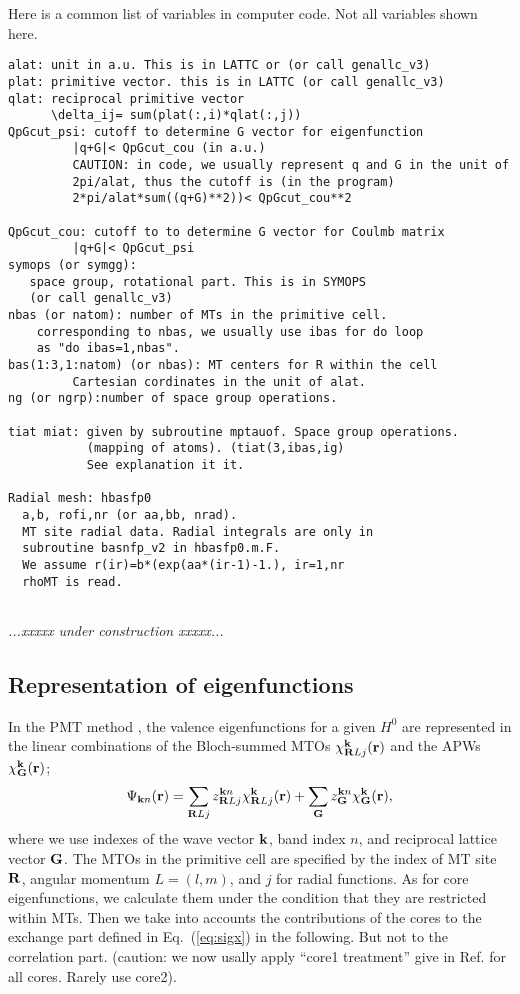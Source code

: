 \documentclass[a4paper,10pt,epsf,fleqn]{article}
\def\Psikn{\Psi_{{\bf k}n}}
\def\Psikn{{\Psi_{{\bf k}n}}}
\def\brl{{\bf R}L}
\def\H0{H^0}
\def\underconstruction{{\it...xxxxx under construction xxxxx...\\}}
\newcommand{\bfk}{{\bf k}}
\newcommand{\bfr}{{\bf r}}
\newcommand{\bfG}{{\bf G}}
\newcommand{\bfR}{{\bf R}}
\newcommand{\req}[1]{\mbox{Eq.~(\ref{#1})}}
\begin{document}
Here is a common list of variables in computer code.
Not all variables shown here.
\begin{verbatim}
alat: unit in a.u. This is in LATTC or (or call genallc_v3)
plat: primitive vector. this is in LATTC (or call genallc_v3)
qlat: reciprocal primitive vector  
      \delta_ij= sum(plat(:,i)*qlat(:,j))
QpGcut_psi: cutoff to determine G vector for eigenfunction
         |q+G|< QpGcut_cou (in a.u.)
         CAUTION: in code, we usually represent q and G in the unit of
         2pi/alat, thus the cutoff is (in the program)
         2*pi/alat*sum((q+G)**2))< QpGcut_cou**2
         
QpGcut_cou: cutoff to to determine G vector for Coulmb matrix
         |q+G|< QpGcut_psi
symops (or symgg): 
   space group, rotational part. This is in SYMOPS 
   (or call genallc_v3)
nbas (or natom): number of MTs in the primitive cell.
    corresponding to nbas, we usually use ibas for do loop
    as "do ibas=1,nbas".
bas(1:3,1:natom) (or nbas): MT centers for R within the cell
         Cartesian cordinates in the unit of alat.
ng (or ngrp):number of space group operations. 

tiat miat: given by subroutine mptauof. Space group operations.
           (mapping of atoms). (tiat(3,ibas,ig)
           See explanation it it.

Radial mesh: hbasfp0
  a,b, rofi,nr (or aa,bb, nrad).
  MT site radial data. Radial integrals are only in 
  subroutine basnfp_v2 in hbasfp0.m.F.
  We assume r(ir)=b*(exp(aa*(ir-1)-1.), ir=1,nr
  rhoMT is read.
  
\end{verbatim}

\underconstruction

\subsection{Representation of eigenfunctions}
In the PMT method \cite{kotani_fusion_2010}, 
the valence eigenfunctions for a given $\H0$ are represented
in the linear combinations of the Bloch-summed MTOs
$\chi^{\bfk}_{\brl{j}}({\bf r})$ and the APWs $\chi^{\bfk}_\bfG (\bfr)$;
\begin{eqnarray}
\label{eq:lmtopsi}
\Psikn(\bfr) = \sum_{\brl{j}} z^{{\bfk}n}_{\brl{j}}
\chi^{\bfk}_{\brl{j}}({\bfr})+ \sum_{\bfG} z^{\bfk n}_{\bfG}
\chi^{\bfk}_\bfG(\bfr),
\label{eqeigen}
\end{eqnarray}
where we use indexes of the wave vector $\bfk$, band index $n$, and 
reciprocal lattice vector $\bfG$. The MTOs in the primitive cell are 
specified by the index of MT site $\bfR$, 
angular momentum $L=(l,m)$, and $j$ for radial functions. 
As for core eigenfunctions, we calculate them under the condition
that they are restricted within MTs.
Then we take into accounts the contributions of the cores to the exchange part defined in \req{eq:sigx} in the following. But not to the correlation part. 
{\small (caution: we now usally apply ``core1 treatment'' give in 
Ref.\cite{kotani07a} for all cores. Rarely use core2).}
\end{document}
